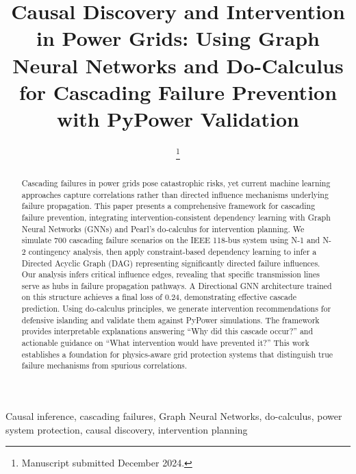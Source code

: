 \documentclass[journal,12pt,onecolumn]{IEEEtran}
\begin{document}
\title{Causal Discovery and Intervention in Power Grids: Using Graph Neural Networks and Do-Calculus for Cascading Failure Prevention with PyPower Validation}

\author{
\thanks{Manuscript submitted December 2024.}
}

\maketitle

\begin{abstract}
Cascading failures in power grids pose catastrophic risks, yet current machine learning approaches capture correlations rather than directed influence mechanisms underlying failure propagation. This paper presents a comprehensive framework for cascading failure prevention, integrating intervention-consistent dependency learning with Graph Neural Networks (GNNs) and Pearl's do-calculus for intervention planning. We simulate 700 cascading failure scenarios on the IEEE 118-bus system using N-1 and N-2 contingency analysis, then apply constraint-based dependency learning to infer a Directed Acyclic Graph (DAG) representing significantly directed failure influences. Our analysis infers critical influence edges, revealing that specific transmission lines serve as hubs in failure propagation pathways. A Directional GNN architecture trained on this structure achieves a final loss of 0.24, demonstrating effective cascade prediction. Using do-calculus principles, we generate intervention recommendations for defensive islanding and validate them against PyPower simulations. The framework provides interpretable explanations answering ``Why did this cascade occur?'' and actionable guidance on ``What intervention would have prevented it?'' This work establishes a foundation for physics-aware grid protection systems that distinguish true failure mechanisms from spurious correlations.
\end{abstract}

\begin{IEEEkeywords}
Causal inference, cascading failures, Graph Neural Networks, do-calculus, power system protection, causal discovery, intervention planning
\end{IEEEkeywords}

\end{document}
